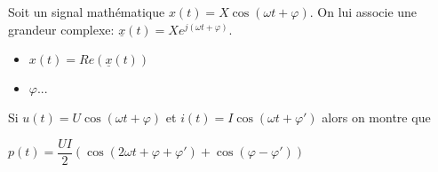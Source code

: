 \begin{defi}
Soit un signal mathématique $x(t)=X \cos\left( \omega t + \varphi \right)$. On lui associe 
une grandeur complexe: $\underline{x}(t)=X e^{j\left(\omega t + \varphi\right)}$.
\end{defi}

\begin{resultat}
\begin{itemize}
\item $x(t) = Re\left(\underline{x}(t)\right)$
\item $\varphi ... $
\end{itemize}
\end{resultat}



\begin{resultat}
Si $u(t)=U\cos\left(\omega t + \varphi\right)$
et 
$i(t)=I\cos\left(\omega t + \varphi'\right)$ 
alors on montre que 

$p(t)=\dfrac{UI}{2}\left( \cos\left(2\omega t + \varphi + \varphi' \right)+\cos\left(\varphi -\varphi' \right)\right)$
\end{resultat}